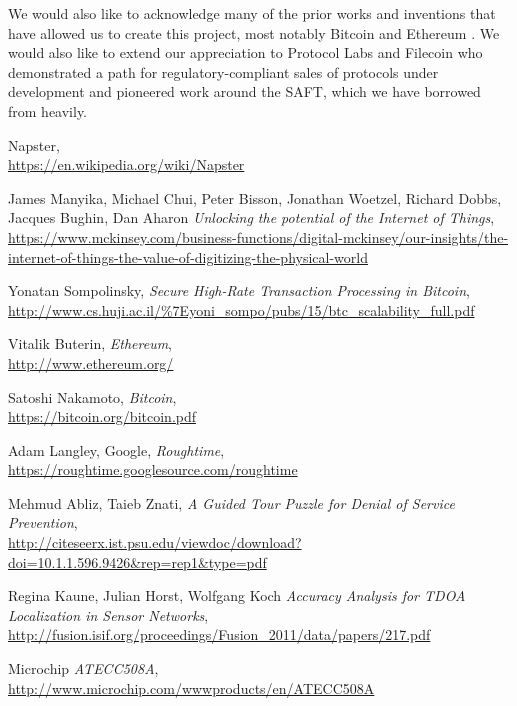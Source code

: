 \documentclass[letterpaper,11pt]{article}
\begin{document}
We would also like to acknowledge many of the prior works and inventions that have allowed us to create this project, most notably Bitcoin \cite{bitcoin} and Ethereum \cite{ethereum}. We would also like to extend our appreciation to Protocol Labs \cite{protocol} and Filecoin \cite{filecoin} who demonstrated a path for regulatory-compliant sales of protocols under development and pioneered work around the SAFT, which we have borrowed from heavily.
\newpage

\begin{thebibliography}{9}

	Napster, \\
		\url{https://en.wikipedia.org/wiki/Napster}

	James Manyika, Michael Chui, Peter Bisson, Jonathan Woetzel, Richard Dobbs, Jacques Bughin, Dan Aharon
		\textit{Unlocking the potential of the Internet of Things}, \\
		\url{https://www.mckinsey.com/business-functions/digital-mckinsey/our-insights/the-internet-of-things-the-value-of-digitizing-the-physical-world}

	Yonatan Sompolinsky,
		\textit{Secure High-Rate Transaction Processing in Bitcoin}, \\
		\url{http://www.cs.huji.ac.il/\%7Eyoni\_sompo/pubs/15/btc\_scalability\_full.pdf}

	Vitalik Buterin,
		\textit{Ethereum},\\
		\url{http://www.ethereum.org/}

	Satoshi Nakamoto,
		\textit{Bitcoin}, \\
		\url{https://bitcoin.org/bitcoin.pdf}

	Adam Langley, Google,
		\textit{Roughtime}, \\
		\url{https://roughtime.googlesource.com/roughtime}

	Mehmud Abliz, Taieb Znati,
		\textit{A Guided Tour Puzzle for Denial of Service Prevention}, \\
		\url{http://citeseerx.ist.psu.edu/viewdoc/download?doi=10.1.1.596.9426&rep=rep1&type=pdf}

	Regina Kaune, Julian Horst, Wolfgang Koch
		\textit{Accuracy Analysis for TDOA Localization in Sensor Networks}, \\
		\url{http://fusion.isif.org/proceedings/Fusion_2011/data/papers/217.pdf}

	Microchip
		\textit{ATECC508A}, \\
		\url{http://www.microchip.com/wwwproducts/en/ATECC508A}


\end{thebibliography}
\end{document}
